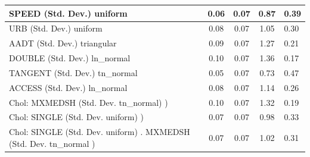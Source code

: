 \begin{table}
\begin{center}
\begin{tabular}{|l|l|c|c|c|l|}
			\hline
			SPEED (Std. Dev.) uniform &  & 0.06 & 0.07 & 0.87 & 0.39 \\
			\hline
			URB (Std. Dev.) uniform &  & 0.08 & 0.07 & 1.05 & 0.30 \\
			\hline
			AADT (Std. Dev.) triangular &  & 0.09 & 0.07 & 1.27 & 0.21 \\
			\hline
			DOUBLE (Std. Dev.) ln_normal &  & 0.10 & 0.07 & 1.36 & 0.17 \\
			\hline
			TANGENT (Std. Dev.) tn_normal &  & 0.05 & 0.07 & 0.73 & 0.47 \\
			\hline
			ACCESS (Std. Dev.) ln_normal &  & 0.08 & 0.07 & 1.14 & 0.26 \\
			\hline
			 Chol: MXMEDSH (Std. Dev. tn_normal) ) &  & 0.10 & 0.07 & 1.32 & 0.19 \\
			\hline
			 Chol: SINGLE (Std. Dev. uniform) ) &  & 0.07 & 0.07 & 0.98 & 0.33 \\
			\hline
			 Chol: SINGLE (Std. Dev. uniform) . MXMEDSH (Std. Dev.   tn_normal ) &  & 0.07 & 0.07 & 1.02 & 0.31 \\
			\hline
		\end{tabular}
	\end{center}
\end{table}